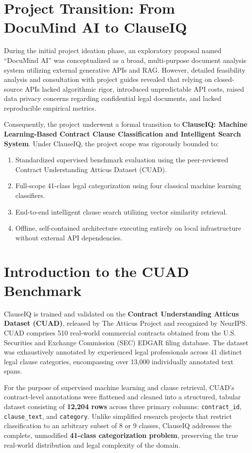 \section*{Project Transition: From DocuMind AI to ClauseIQ}
\label{sec:project_transition}
During the initial project ideation phase, an exploratory proposal named ``DocuMind AI'' was conceptualized as a broad, multi-purpose document analysis system utilizing external generative APIs and RAG. However, detailed feasibility analysis and consultation with project guides revealed that relying on closed-source APIs lacked algorithmic rigor, introduced unpredictable API costs, raised data privacy concerns regarding confidential legal documents, and lacked reproducible empirical metrics.

Consequently, the project underwent a formal transition to \textbf{ClauseIQ: Machine Learning-Based Contract Clause Classification and Intelligent Search System}. Under ClauseIQ, the project scope was rigorously bounded to:
\begin{enumerate}
    \item Standardized supervised benchmark evaluation using the peer-reviewed Contract Understanding Atticus Dataset (CUAD).
    \item Full-scope 41-class legal categorization using four classical machine learning classifiers.
    \item End-to-end intelligent clause search utilizing vector similarity retrieval.
    \item Offline, self-contained architecture executing entirely on local infrastructure without external API dependencies.
\end{enumerate}

\section*{Introduction to the CUAD Benchmark}
\label{sec:cuad_intro}
ClauseIQ is trained and validated on the \textbf{Contract Understanding Atticus Dataset (CUAD)}, released by The Atticus Project and recognized by NeurIPS. CUAD comprises 510 real-world commercial contracts obtained from the U.S. Securities and Exchange Commission (SEC) EDGAR filing database. The dataset was exhaustively annotated by experienced legal professionals across 41 distinct legal clause categories, encompassing over 13,000 individually annotated text spans.

For the purpose of supervised machine learning and clause retrieval, CUAD's contract-level annotations were flattened and cleaned into a structured, tabular dataset consisting of \textbf{12,204 rows} across three primary columns: \texttt{contract\_id}, \texttt{clause\_text}, and \texttt{category}. Unlike simplified research projects that restrict classification to an arbitrary subset of 8 or 9 classes, ClauseIQ addresses the complete, unmodified \textbf{41-class categorization problem}, preserving the true real-world distribution and legal complexity of the domain.


